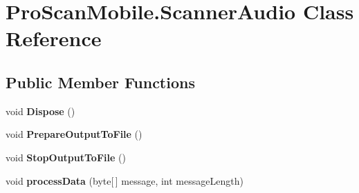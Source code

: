 \hypertarget{class_pro_scan_mobile_1_1_scanner_audio}{\section{Pro\-Scan\-Mobile.\-Scanner\-Audio Class Reference}
\label{class_pro_scan_mobile_1_1_scanner_audio}
}
\subsection*{Public Member Functions}
\begin{DoxyCompactItemize}
\item 
\hypertarget{class_pro_scan_mobile_1_1_scanner_audio_a0bf4a22616d20987c42335737acba9ba}{void {\bfseries Dispose} ()}\label{class_pro_scan_mobile_1_1_scanner_audio_a0bf4a22616d20987c42335737acba9ba}

\item 
\hypertarget{class_pro_scan_mobile_1_1_scanner_audio_a14667ddc0ec45ddf2d0b8f1e75401d61}{void {\bfseries Prepare\-Output\-To\-File} ()}\label{class_pro_scan_mobile_1_1_scanner_audio_a14667ddc0ec45ddf2d0b8f1e75401d61}

\item 
\hypertarget{class_pro_scan_mobile_1_1_scanner_audio_a68f3c557cb4f1a304037a59b14190c3a}{void {\bfseries Stop\-Output\-To\-File} ()}\label{class_pro_scan_mobile_1_1_scanner_audio_a68f3c557cb4f1a304037a59b14190c3a}

\item 
\hypertarget{class_pro_scan_mobile_1_1_scanner_audio_af5f0f970d508baf9bd732bcbd74fe1a1}{void {\bfseries process\-Data} (byte\mbox{[}$\,$\mbox{]} message, int message\-Length)}\label{class_pro_scan_mobile_1_1_scanner_audio_af5f0f970d508baf9bd732bcbd74fe1a1}

\end{DoxyCompactItemize}
